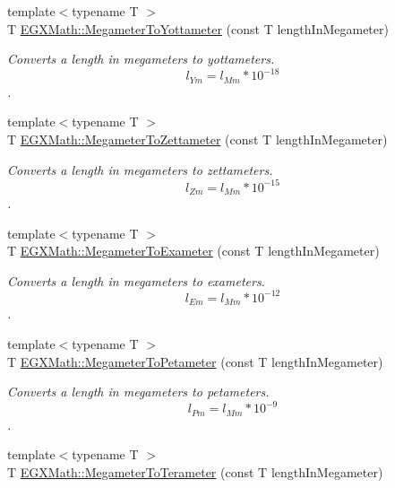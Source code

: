 \begin{DoxyCompactItemize}
{\footnotesize template$<$typename T $>$ }\\T \mbox{\hyperlink{group___e_g_x_math-_conversions-_length_conversions-_s_i-_megameter-_s_i_ga3d729dabc7c37d927c02cf4ae0c560d4}{E\+G\+X\+Math\+::\+Megameter\+To\+Yottameter}} (const T length\+In\+Megameter)
\begin{DoxyCompactList}\small\item\em Converts a length in megameters to yottameters. \[ l_{Ym}=l_{Mm} * 10^{-18} \]. \end{DoxyCompactList}\item 
{\footnotesize template$<$typename T $>$ }\\T \mbox{\hyperlink{group___e_g_x_math-_conversions-_length_conversions-_s_i-_megameter-_s_i_ga3a8765b61b237025a1f8a72a25443cd7}{E\+G\+X\+Math\+::\+Megameter\+To\+Zettameter}} (const T length\+In\+Megameter)
\begin{DoxyCompactList}\small\item\em Converts a length in megameters to zettameters. \[ l_{Zm}=l_{Mm} * 10^{-15} \]. \end{DoxyCompactList}\item 
{\footnotesize template$<$typename T $>$ }\\T \mbox{\hyperlink{group___e_g_x_math-_conversions-_length_conversions-_s_i-_megameter-_s_i_ga30aed22a379d3215a2d660a4219c6936}{E\+G\+X\+Math\+::\+Megameter\+To\+Exameter}} (const T length\+In\+Megameter)
\begin{DoxyCompactList}\small\item\em Converts a length in megameters to exameters. \[ l_{Em}=l_{Mm} * 10^{-12} \]. \end{DoxyCompactList}\item 
{\footnotesize template$<$typename T $>$ }\\T \mbox{\hyperlink{group___e_g_x_math-_conversions-_length_conversions-_s_i-_megameter-_s_i_gad40646b8456e092061f26bc6c6c65925}{E\+G\+X\+Math\+::\+Megameter\+To\+Petameter}} (const T length\+In\+Megameter)
\begin{DoxyCompactList}\small\item\em Converts a length in megameters to petameters. \[ l_{Pm}=l_{Mm} * 10^{-9} \]. \end{DoxyCompactList}\item 
{\footnotesize template$<$typename T $>$ }\\T \mbox{\hyperlink{group___e_g_x_math-_conversions-_length_conversions-_s_i-_megameter-_s_i_ga381dd9fb7b3a0867e03bde8de98ee82e}{E\+G\+X\+Math\+::\+Megameter\+To\+Terameter}} (const T length\+In\+Megameter)

\end{DoxyCompactItemize}
